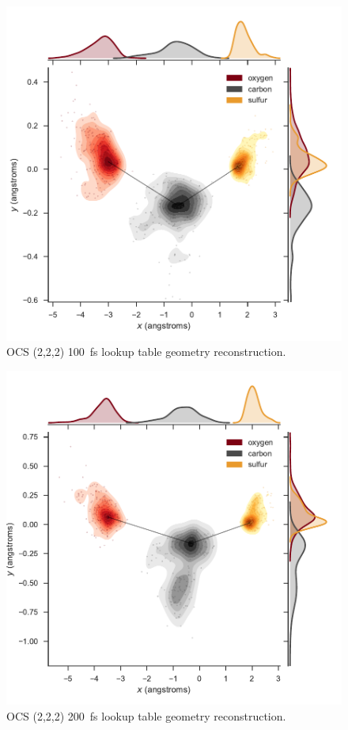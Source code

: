 \begin{figure}
  \centering
  \includegraphics[width=\textwidth]{Plots/OCS222100fsLTGeometry}
  \caption[OCS (2,2,2) \SI{100}{\fs} lookup table geometry reconstruction.]
  {OCS (2,2,2) \SI{100}{\fs} lookup table geometry reconstruction.}
  \label{fig:OCS222100fsLTGeometry}
\end{figure}

\begin{figure}
  \centering
  \includegraphics[width=\textwidth]{Plots/OCS222200fsLTGeometry}
  \caption[OCS (2,2,2) \SI{200}{\fs} lookup table geometry reconstruction.]
  {OCS (2,2,2) \SI{200}{\fs} lookup table geometry reconstruction.}
  \label{fig:OCS222200fsLTGeometry}
\end{figure}

